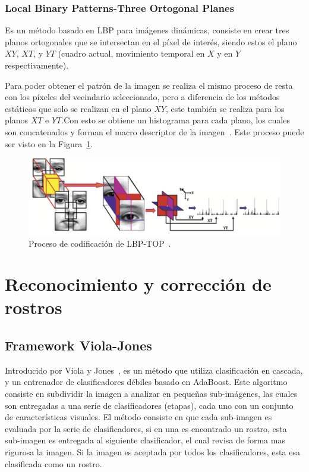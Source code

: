 		\subsubsection{Local Binary Patterns-Three Ortogonal Planes}
		\label{sec:lbp-top}
		 Es un método basado en LBP para imágenes dinámicas, consiste en crear tres planos ortogonales que se intersectan en el píxel de interés, siendo estos el plano $XY$, $XT$, y $YT$ (cuadro actual, movimiento temporal en $X$ y en $Y$ respectivamente). 

Para poder obtener el patrón de la imagen se realiza el mismo proceso de resta con los píxeles del vecindario seleccionado, pero a diferencia de los métodos estáticos que solo se realizan en el plano $XY$, este también se realiza para los planos $XT$ e $YT$.\@ Con esto se obtiene un histograma para cada plano, los cuales son concatenados y forman el macro descriptor de la imagen~\cite{Zhao2007}. Este proceso puede ser visto en la Figura~\ref{art:fig:lbptop}.


\begin{figure}[tb]
  \centering
   \includegraphics[width=1\textwidth]{Figuras/lbptop.pdf}
  \caption{Proceso de codificación de LBP-TOP~\cite{Zhao2007}.}
  \label{art:fig:lbptop}
\end{figure}


\section{Reconocimiento y corrección de rostros}
\label{sec:rec_rostros}

	\subsection{Framework Viola-Jones}
	\label{sec:viola-jones}
	Introducido por Viola y Jones~\cite{Jones2003}, es un método que utiliza clasificación en cascada, y un entrenador de clasificadores débiles basado en AdaBoost. Este algoritmo consiste en subdividir la imagen a analizar en pequeñas sub-imágenes, las cuales son entregadas a una serie de clasificadores (etapas), cada uno con un conjunto de características visuales. El método consiste en que cada sub-imagen es evaluada por la serie de clasificadores, si en una es encontrado un rostro, esta sub-imagen es entregada al siguiente clasificador, el cual revisa de forma mas rigurosa la imagen. Si la imagen es aceptada por todos los clasificadores, esta esa clasificada como un rostro.
	
